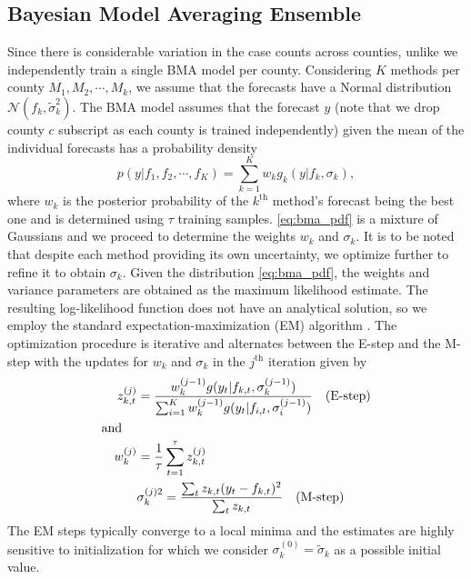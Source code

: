\documentclass[sigconf]{acmart}
\begin{document}
\subsection{Bayesian Model Averaging Ensemble}
Since there is considerable variation in the case counts across counties, unlike \cite{raftery2005using,yamana2017individual} we independently train a single BMA model per county. Considering $K$ methods per county $M_1, M_2, \cdots, M_k$, we assume that the forecasts have a Normal distribution $\mathcal{N}(f_k,\tilde{\sigma}^2_k)$. The BMA model assumes that the forecast $y$ (note that we drop county $c$ subscript as each county is trained independently) given the mean of the individual forecasts has a probability density
\begin{equation}
    p(y| f_1, f_2, \cdots, f_K) = \sum_{k=1}^{K} w_k g_k (y|f_k,\sigma_k),
    \label{eq:bma_pdf}
\end{equation}
where $w_k$ is the posterior probability of the $k^{\text{th}}$ method's forecast being the best one and is determined using $\tau$ training samples. \eqref{eq:bma_pdf} is a mixture of Gaussians and we proceed to determine the weights $w_k$ and $\sigma_k$. It is to be noted that despite each method providing its own uncertainty, we optimize further to refine it to obtain $\sigma_k$. Given the distribution \eqref{eq:bma_pdf}, the weights and variance parameters are obtained as the maximum likelihood estimate. The resulting log-likelihood function does not have an analytical solution, so we employ the standard expectation-maximization (EM) algorithm \cite{bilmes1998gentle}. The optimization procedure is iterative and alternates between the E-step and the M-step with the updates for $w_k$ and $\sigma_k$ in the $j^{\text{th}}$ iteration given by
\begin{align}
    \quad z^{(j)}_{k,t} &= \frac{w^{(j-1)}_kg({y_t|f_{k,t}, \sigma_k^{(j-1)}})}{\sum_{i=1}^K w^{(j-1)}_kg(y_t|f_{i,t}, \sigma_i^{(j-1)})} \quad (\text{E-step}) \nonumber\\ \intertext{and}
    \quad w^{(j)}_k &= \frac{1}{\tau} \sum_{t=1}^\tau z_{k,t}^{(j)}\nonumber \\
    &\sigma^{(j)2}_k = \frac{\sum_{t}z_{k,t}(y_t-f_{k,t})^2}{\sum_{t}z_{k,t}  } \quad (\text{M-step})
    \label{eq:bma_fixed}
\end{align}
The EM steps typically converge to a local minima and the estimates are highly sensitive to initialization for which we consider $\sigma^{(0)}_k=\tilde{\sigma}_k$ as a possible initial value. 
\end{document}
